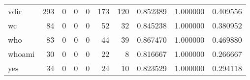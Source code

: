 \begin{tabular}{lrrrrrrrrr}
vdir      &                                       293 &                                                  0 &                                                  0 &                                                  0 &                                                173 &                                                120 &                                           0.852389 &                               1.000000 &                             0.409556 \\
wc        &                                        84 &                                                  0 &                                                  0 &                                                  0 &                                                 52 &                                                 32 &                                           0.845238 &                               1.000000 &                             0.380952 \\
who       &                                        83 &                                                  0 &                                                  0 &                                                  0 &                                                 44 &                                                 39 &                                           0.867470 &                               1.000000 &                             0.469880 \\
whoami    &                                        30 &                                                  0 &                                                  0 &                                                  0 &                                                 22 &                                                  8 &                                           0.816667 &                               1.000000 &                             0.266667 \\
yes       &                                        34 &                                                  0 &                                                  0 &                                                  0 &                                                 24 &                                                 10 &                                           0.823529 &                               1.000000 &                             0.294118 \\
\bottomrule
\end{tabular}
